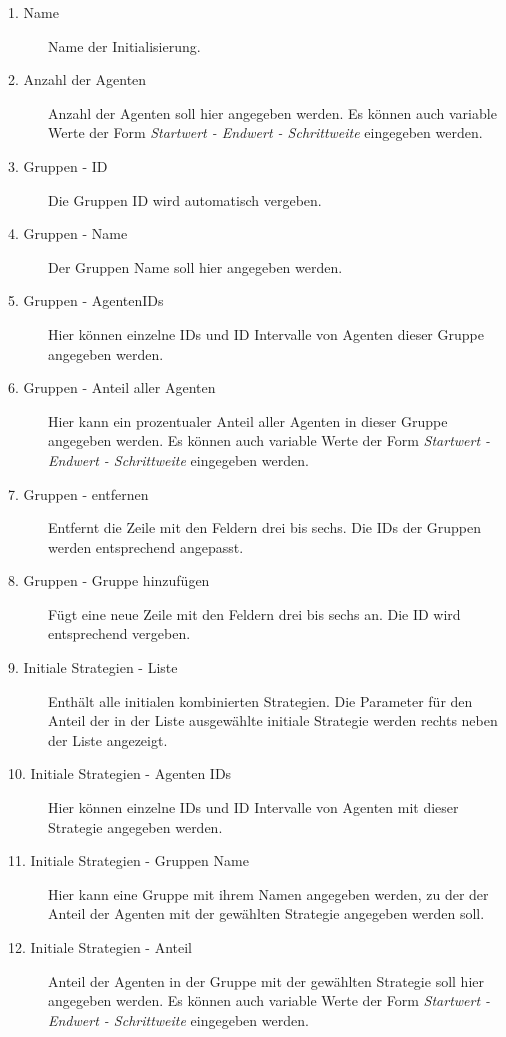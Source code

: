 \begin{description}


\item[1. Name] Name der Initialisierung.

\item[2. Anzahl der Agenten] Anzahl der Agenten soll hier angegeben werden. Es können auch variable Werte der Form \textit{Startwert - Endwert - Schrittweite} eingegeben werden.

\item[3. Gruppen - ID] Die Gruppen ID wird automatisch vergeben.

\item[4. Gruppen - Name] Der Gruppen Name soll hier angegeben werden.

\item[5. Gruppen - AgentenIDs] Hier können einzelne IDs und ID Intervalle von Agenten dieser Gruppe angegeben werden. 

\item[6. Gruppen - Anteil aller Agenten] Hier kann ein prozentualer Anteil aller Agenten in dieser Gruppe angegeben werden. Es können auch variable Werte der Form \textit{Startwert - Endwert - Schrittweite} eingegeben werden.

\item[7. Gruppen - entfernen] Entfernt die Zeile mit den Feldern drei bis sechs. Die IDs der Gruppen werden entsprechend angepasst. 

\item[8. Gruppen - Gruppe hinzufügen] Fügt eine neue Zeile mit den Feldern drei bis sechs an. Die ID wird entsprechend vergeben.

\item[9. Initiale Strategien - Liste] Enthält alle initialen kombinierten Strategien. Die Parameter für den Anteil der in der Liste ausgewählte initiale Strategie werden rechts neben der Liste angezeigt. 

\item[10. Initiale Strategien - Agenten IDs] Hier können einzelne IDs und ID Intervalle von Agenten mit dieser Strategie angegeben werden. 

\item[11. Initiale Strategien - Gruppen Name] Hier kann eine Gruppe mit ihrem Namen angegeben werden, zu der der Anteil der Agenten mit der gewählten Strategie angegeben werden soll.

\item[12. Initiale Strategien - Anteil] Anteil der Agenten in der Gruppe mit der gewählten Strategie soll hier angegeben werden. Es können auch variable Werte der Form \textit{Startwert - Endwert - Schrittweite} eingegeben werden.


\end{description}
